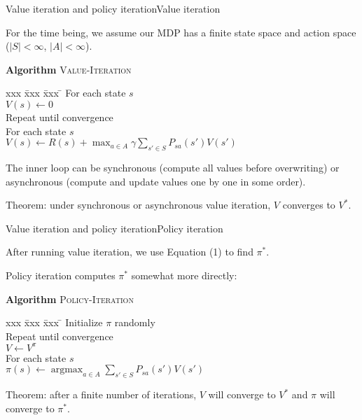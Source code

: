\documentclass{beamer}
\DeclareMathOperator*{\argmax}{argmax}
\begin{document}
\begin{frame}{Value iteration and policy iteration}{Value iteration}

  For the time being, we assume our MDP has a finite state space and
  action space ($|S| < \infty$, $|A| < \infty$).

  \begin{block}{\textbf{Algorithm} \textsc{Value-Iteration}}
    \begin{tabbing}
      xxx \= xxx \= xxx \= \kill    
      \> For each state $s$ \\
      \> \> $V(s) \leftarrow 0$ \\
      \> Repeat until convergence \\
      \> \> For each state $s$ \\
      \> \> \>
      $V(s) \leftarrow R(s) + \max_{a\in A} \gamma \sum_{s'\in S} P_{sa}(s')V(s')$
    \end{tabbing}
  \end{block}

  \medskip

  The inner loop can be \alert{synchronous} (compute all values
  before overwriting) or \alert{asynchronous} (compute and update values
  one by one in some order).

  \medskip

  Theorem: \alert{under synchronous or asynchronous value iteration, $V$ converges to $V^*$}.
    
\end{frame}


\begin{frame}{Value iteration and policy iteration}{Policy iteration}

  After running value iteration, we use Equation (1) to find $\pi^*$.

  \medskip

  \alert{Policy iteration} computes $\pi^*$ somewhat more directly:
  \begin{block}{\textbf{Algorithm} \textsc{Policy-Iteration}}
    \begin{tabbing}
      xxx \= xxx \= xxx \= \kill    
      \> Initialize $\pi$ randomly \\
      \> Repeat until convergence \\
      \> \> $V \leftarrow V^\pi$ \\
      \> \> For each state $s$ \\
      \> \> \> $\pi(s) \leftarrow \argmax_{a\in A}\sum_{s'\in S}P_{sa}(s')V(s')$
    \end{tabbing}
  \end{block}

  \medskip

  Theorem: after a finite number of iterations, \alert{$V$ will converge to
  $V^*$ and $\pi$ will converge to $\pi^*$}.
  
\end{frame}
\end{document}
